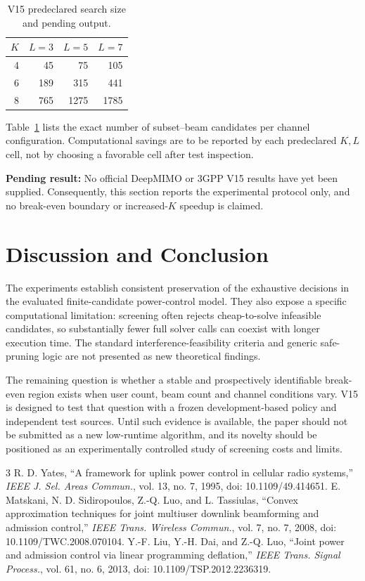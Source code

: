 \documentclass[journal]{IEEEtran}
\begin{document}
\begin{table}[t]
\caption{V15 predeclared search size and pending output.}
\label{tab:v15}\centering\footnotesize
\begin{tabular}{rrrr}\toprule
$K$ & $L=3$ & $L=5$ & $L=7$\\\midrule
4 & 45 & 75 & 105\\
6 & 189 & 315 & 441\\
8 & 765 & 1275 & 1785\\\bottomrule
\end{tabular}
\end{table}
Table~\ref{tab:v15} lists the exact number of subset--beam candidates per channel configuration. Computational savings are to be reported by each predeclared $K,L$ cell, not by choosing a favorable cell after test inspection.

\textbf{Pending result:} No official DeepMIMO or 3GPP V15 results have yet been supplied. Consequently, this section reports the experimental protocol only, and no break-even boundary or increased-$K$ speedup is claimed.

\section{Discussion and Conclusion}
The experiments establish consistent preservation of the exhaustive decisions in the evaluated finite-candidate power-control model. They also expose a specific computational limitation: screening often rejects cheap-to-solve infeasible candidates, so substantially fewer full solver calls can coexist with longer execution time. The standard interference-feasibility criteria and generic safe-pruning logic are not presented as new theoretical findings.

The remaining question is whether a stable and prospectively identifiable break-even region exists when user count, beam count and channel conditions vary. V15 is designed to test that question with a frozen development-based policy and independent test sources. Until such evidence is available, the paper should not be submitted as a new low-runtime algorithm, and its novelty should be positioned as an experimentally controlled study of screening costs and limits.
\begin{thebibliography}{3}
 R. D. Yates, ``A framework for uplink power control in cellular radio systems,'' \emph{IEEE J. Sel. Areas Commun.}, vol. 13, no. 7, 1995, doi: 10.1109/49.414651.
 E. Matskani, N. D. Sidiropoulos, Z.-Q. Luo, and L. Tassiulas, ``Convex approximation techniques for joint multiuser downlink beamforming and admission control,'' \emph{IEEE Trans. Wireless Commun.}, vol. 7, no. 7, 2008, doi: 10.1109/TWC.2008.070104.
 Y.-F. Liu, Y.-H. Dai, and Z.-Q. Luo, ``Joint power and admission control via linear programming deflation,'' \emph{IEEE Trans. Signal Process.}, vol. 61, no. 6, 2013, doi: 10.1109/TSP.2012.2236319.
\end{thebibliography}
\end{document}
